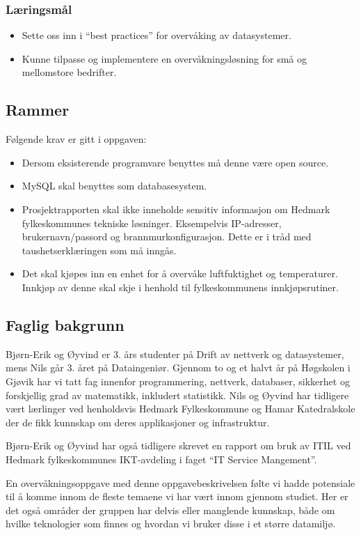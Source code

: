 \subsubsection{Læringsmål}
\begin{itemize}
	\item Sette oss inn i “best practices” for overvåking av datasystemer.
	\item Kunne tilpasse og implementere en overvåkningsløsning for små og mellomstore bedrifter.
\end{itemize}

\subsection{Rammer}
Følgende krav er gitt i oppgaven:
\begin{itemize}
	\item Dersom eksisterende programvare benyttes må denne være open source.
	\item MySQL skal benyttes som databasesystem.
	\item Prosjektrapporten skal ikke inneholde sensitiv informasjon om Hedmark fylkeskommunes tekniske løsninger. Eksempelvis IP-adresser, brukernavn/passord og brannmurkonfigurasjon. Dette er i tråd med taushetserklæringen som må inngås.
	\item Det skal kjøpes inn en enhet for å overvåke luftfuktighet og temperaturer. Innkjøp av denne skal skje i henhold til fylkeskommunens innkjøpsrutiner.
\end{itemize}

\subsection{Faglig bakgrunn}


Bjørn-Erik og Øyvind er 3. års studenter på Drift av nettverk og datasystemer, mens Nils går 3. året på Dataingeniør. Gjennom to og et halvt år på Høgskolen i Gjøvik har vi tatt fag innenfor programmering, nettverk, databaser, sikkerhet og forskjellig grad av matematikk, inkludert statistikk. Nils og Øyvind har tidligere vært lærlinger ved henholdsvis Hedmark Fylkeskommune og Hamar Katedralskole der de fikk kunnskap om deres applikasjoner og infrastruktur.

Bjørn-Erik og Øyvind har også tidligere skrevet en rapport om bruk av ITIL ved Hedmark fylkeskommunes IKT-avdeling i faget “IT Service Mangement”.

En overvåkningsoppgave med denne oppgavebeskrivelsen følte vi hadde potensiale til å komme innom de fleste temaene vi har vært innom gjennom studiet. Her er det også områder der gruppen har delvis eller manglende kunnskap, både om hvilke teknologier som finnes og hvordan vi bruker disse i et større datamiljø.

